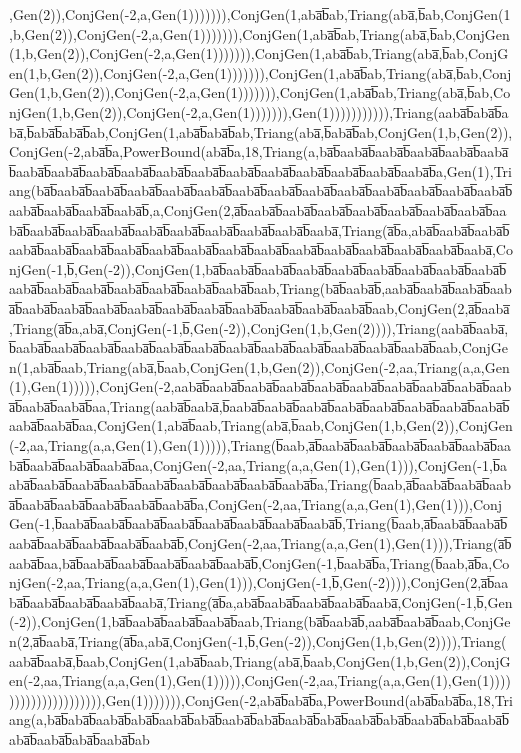 ,Gen(2)),ConjGen(-2,a,Gen(1))))))),ConjGen(1,aba̅b̅ab,Triang(aba̅,b̅ab,ConjGen(1,b,Gen(2)),ConjGen(-2,a,Gen(1))))))),ConjGen(1,aba̅b̅ab,Triang(aba̅,b̅ab,ConjGen(1,b,Gen(2)),ConjGen(-2,a,Gen(1))))))),ConjGen(1,aba̅b̅ab,Triang(aba̅,b̅ab,ConjGen(1,b,Gen(2)),ConjGen(-2,a,Gen(1))))))),ConjGen(1,aba̅b̅ab,Triang(aba̅,b̅ab,ConjGen(1,b,Gen(2)),ConjGen(-2,a,Gen(1))))))),ConjGen(1,aba̅b̅ab,Triang(aba̅,b̅ab,ConjGen(1,b,Gen(2)),ConjGen(-2,a,Gen(1))))))),Gen(1))))))))))),Triang(aaba̅b̅aba̅b̅aba̅,b̅aba̅b̅aba̅b̅ab,ConjGen(1,aba̅b̅aba̅b̅ab,Triang(aba̅,b̅aba̅b̅ab,ConjGen(1,b,Gen(2)),ConjGen(-2,aba̅b̅a,PowerBound(aba̅b̅a,18,Triang(a,ba̅b̅aaba̅b̅aaba̅b̅aaba̅b̅aaba̅b̅aaba̅b̅aaba̅b̅aaba̅b̅aaba̅b̅aaba̅b̅aaba̅b̅aaba̅b̅aaba̅b̅aaba̅b̅aaba̅b̅aaba̅b̅aaba̅b̅aaba̅b̅a,Gen(1),Triang(ba̅b̅aaba̅b̅aaba̅b̅aaba̅b̅aaba̅b̅aaba̅b̅aaba̅b̅aaba̅b̅aaba̅b̅aaba̅b̅aaba̅b̅aaba̅b̅aaba̅b̅aaba̅b̅aaba̅b̅aaba̅b̅aaba̅b̅aaba̅b̅,a,ConjGen(2,a̅b̅aaba̅b̅aaba̅b̅aaba̅b̅aaba̅b̅aaba̅b̅aaba̅b̅aaba̅b̅aaba̅b̅aaba̅b̅aaba̅b̅aaba̅b̅aaba̅b̅aaba̅b̅aaba̅b̅aaba̅b̅aaba̅b̅aaba̅,Triang(a̅b̅a,aba̅b̅aaba̅b̅aaba̅b̅aaba̅b̅aaba̅b̅aaba̅b̅aaba̅b̅aaba̅b̅aaba̅b̅aaba̅b̅aaba̅b̅aaba̅b̅aaba̅b̅aaba̅b̅aaba̅b̅aaba̅b̅aaba̅,ConjGen(-1,b̅,Gen(-2)),ConjGen(1,ba̅b̅aaba̅b̅aaba̅b̅aaba̅b̅aaba̅b̅aaba̅b̅aaba̅b̅aaba̅b̅aaba̅b̅aaba̅b̅aaba̅b̅aaba̅b̅aaba̅b̅aaba̅b̅aaba̅b̅aaba̅b̅aab,Triang(ba̅b̅aaba̅b̅,aaba̅b̅aaba̅b̅aaba̅b̅aaba̅b̅aaba̅b̅aaba̅b̅aaba̅b̅aaba̅b̅aaba̅b̅aaba̅b̅aaba̅b̅aaba̅b̅aaba̅b̅aaba̅b̅aab,ConjGen(2,a̅b̅aaba̅,Triang(a̅b̅a,aba̅,ConjGen(-1,b̅,Gen(-2)),ConjGen(1,b,Gen(2)))),Triang(aaba̅b̅aaba̅,b̅aaba̅b̅aaba̅b̅aaba̅b̅aaba̅b̅aaba̅b̅aaba̅b̅aaba̅b̅aaba̅b̅aaba̅b̅aaba̅b̅aaba̅b̅aaba̅b̅aab,ConjGen(1,aba̅b̅aab,Triang(aba̅,b̅aab,ConjGen(1,b,Gen(2)),ConjGen(-2,aa,Triang(a,a,Gen(1),Gen(1))))),ConjGen(-2,aaba̅b̅aaba̅b̅aaba̅b̅aaba̅b̅aaba̅b̅aaba̅b̅aaba̅b̅aaba̅b̅aaba̅b̅aaba̅b̅aaba̅b̅aaba̅b̅aa,Triang(aaba̅b̅aaba̅,b̅aaba̅b̅aaba̅b̅aaba̅b̅aaba̅b̅aaba̅b̅aaba̅b̅aaba̅b̅aaba̅b̅aaba̅b̅aaba̅b̅aa,ConjGen(1,aba̅b̅aab,Triang(aba̅,b̅aab,ConjGen(1,b,Gen(2)),ConjGen(-2,aa,Triang(a,a,Gen(1),Gen(1))))),Triang(b̅aab,a̅b̅aaba̅b̅aaba̅b̅aaba̅b̅aaba̅b̅aaba̅b̅aaba̅b̅aaba̅b̅aaba̅b̅aaba̅b̅aa,ConjGen(-2,aa,Triang(a,a,Gen(1),Gen(1))),ConjGen(-1,b̅aaba̅b̅aaba̅b̅aaba̅b̅aaba̅b̅aaba̅b̅aaba̅b̅aaba̅b̅aaba̅b̅aaba̅b̅a,Triang(b̅aab,a̅b̅aaba̅b̅aaba̅b̅aaba̅b̅aaba̅b̅aaba̅b̅aaba̅b̅aaba̅b̅aaba̅b̅a,ConjGen(-2,aa,Triang(a,a,Gen(1),Gen(1))),ConjGen(-1,b̅aaba̅b̅aaba̅b̅aaba̅b̅aaba̅b̅aaba̅b̅aaba̅b̅aaba̅b̅aaba̅b̅,Triang(b̅aab,a̅b̅aaba̅b̅aaba̅b̅aaba̅b̅aaba̅b̅aaba̅b̅aaba̅b̅aaba̅b̅,ConjGen(-2,aa,Triang(a,a,Gen(1),Gen(1))),Triang(a̅b̅aaba̅b̅aa,ba̅b̅aaba̅b̅aaba̅b̅aaba̅b̅aaba̅b̅aaba̅b̅,ConjGen(-1,b̅aaba̅b̅a,Triang(b̅aab,a̅b̅a,ConjGen(-2,aa,Triang(a,a,Gen(1),Gen(1))),ConjGen(-1,b̅,Gen(-2)))),ConjGen(2,a̅b̅aaba̅b̅aaba̅b̅aaba̅b̅aaba̅b̅aaba̅,Triang(a̅b̅a,aba̅b̅aaba̅b̅aaba̅b̅aaba̅b̅aaba̅,ConjGen(-1,b̅,Gen(-2)),ConjGen(1,ba̅b̅aaba̅b̅aaba̅b̅aaba̅b̅aab,Triang(ba̅b̅aaba̅b̅,aaba̅b̅aaba̅b̅aab,ConjGen(2,a̅b̅aaba̅,Triang(a̅b̅a,aba̅,ConjGen(-1,b̅,Gen(-2)),ConjGen(1,b,Gen(2)))),Triang(aaba̅b̅aaba̅,b̅aab,ConjGen(1,aba̅b̅aab,Triang(aba̅,b̅aab,ConjGen(1,b,Gen(2)),ConjGen(-2,aa,Triang(a,a,Gen(1),Gen(1))))),ConjGen(-2,aa,Triang(a,a,Gen(1),Gen(1))))))))))))))))))))),Gen(1))))))),ConjGen(-2,aba̅b̅aba̅b̅a,PowerBound(aba̅b̅aba̅b̅a,18,Triang(a,ba̅b̅aba̅b̅aaba̅b̅aba̅b̅aaba̅b̅aba̅b̅aaba̅b̅aba̅b̅aaba̅b̅aba̅b̅aaba̅b̅aba̅b̅aaba̅b̅aba̅b̅aaba̅b̅aba̅b̅aaba̅b̅aba̅b̅aaba̅b̅ab
